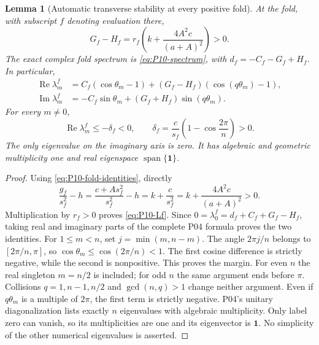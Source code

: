 \documentclass[11pt]{article}
\newcommand{\one}{\mathbf{1}}
\DeclareMathOperator{\Ree}{Re}
\DeclareMathOperator{\Imm}{Im}
\newtheorem{lemma}[theorem]{Lemma}
\theoremstyle{definition}
\theoremstyle{remark}
\begin{document}
\begin{lemma}[Automatic transverse stability at every positive fold]
\label{lem:P10-gap}
At the fold, with subscript $f$ denoting evaluation there,
\begin{equation}
 \boxed{G_f-H_f=r_f\left(k+\frac{4A^2c}{(a+A)^2}\right)>0.}
 \label{eq:P10-Lf}
\end{equation}
The exact complex fold spectrum is \eqref{eq:P10-spectrum}, with
$d_f=-C_f-G_f+H_f$. In particular,
\begin{align}
 \Ree\lambda_m^f
 &=C_f(\cos\theta_m-1)+(G_f-H_f)(\cos(q\theta_m)-1),
 \label{eq:P10-fold-real}\\
 \Imm\lambda_m^f&=-C_f\sin\theta_m+(G_f+H_f)\sin(q\theta_m).
 \label{eq:P10-fold-imag}
\end{align}
For every $m\ne0$,
\begin{equation}
 \boxed{\Ree\lambda_m^f\le-\delta_f<0,\qquad
 \delta_f=\frac c{s_f}\left(1-\cos\frac{2\pi}{n}\right)>0.}
 \label{eq:P10-gap}
\end{equation}
The only eigenvalue on the imaginary axis is zero. It has algebraic
and geometric multiplicity one and real eigenspace
$\operatorname{span}\{\one\}$.
\end{lemma}
\begin{proof}
Using \eqref{eq:P10-fold-identities}, directly
\begin{equation}
 \frac{g_f}{s_f^2}-h
 =\frac{c+A s_f^2}{s_f^2}-h
 =k+\frac c{s_f^2}=k+\frac{4A^2c}{(a+A)^2}>0.
 \label{eq:P10-effective}
\end{equation}
Multiplication by $r_f>0$ proves \eqref{eq:P10-Lf}.
Since $0=\lambda_0^f=d_f+C_f+G_f-H_f$, taking real and imaginary
parts of the complete P04 formula proves the two identities.
For $1\le m<n$, set $j=\min(m,n-m)$. The angle
$2\pi j/n$ belongs to $[2\pi/n,\pi]$, so
$\cos\theta_m\le\cos(2\pi/n)<1$. The first cosine difference
is strictly negative, while the second is nonpositive. This proves
the margin. For even $n$ the real singleton $m=n/2$ is included;
for odd $n$ the same argument ends before $\pi$. Collisions
$q=1,n-1,n/2$ and $\gcd(n,q)>1$ change neither argument.
Even if $q\theta_m$ is a multiple of $2\pi$, the first term is
strictly negative. P04's unitary diagonalization lists exactly $n$
eigenvalues with algebraic multiplicity. Only label zero can vanish,
so its multiplicities are one and its eigenvector is $\one$.
No simplicity of the other numerical eigenvalues is asserted.
\end{proof}
\end{document}
